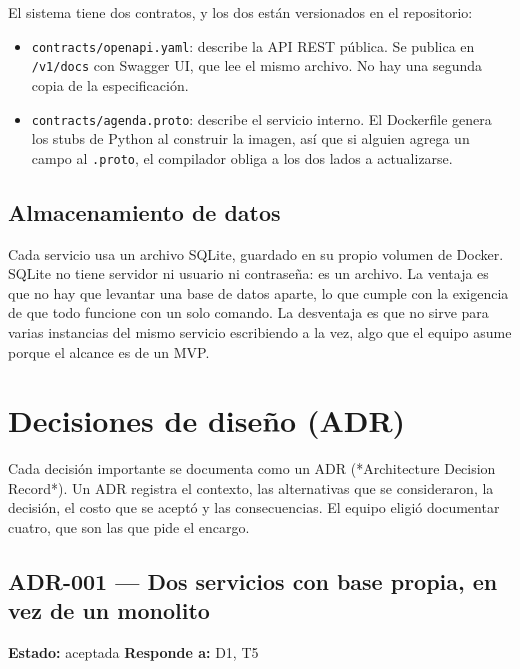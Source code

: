 \documentclass[12pt, a4paper]{article}
\begin{document}
El sistema tiene dos contratos, y los dos están versionados en el
repositorio:

\begin{itemize}[leftmargin=1.4cm]
    \item \texttt{contracts/openapi.yaml}: describe la API REST pública.
    Se publica en \texttt{/v1/docs} con Swagger UI, que lee el mismo
    archivo. No hay una segunda copia de la especificación.
    \item \texttt{contracts/agenda.proto}: describe el servicio interno.
    El Dockerfile genera los stubs de Python al construir la imagen, así
    que si alguien agrega un campo al \texttt{.proto}, el compilador
    obliga a los dos lados a actualizarse.
\end{itemize}

\subsection{Almacenamiento de datos}

Cada servicio usa un archivo SQLite, guardado en su propio volumen de
Docker. SQLite no tiene servidor ni usuario ni contraseña: es un archivo.
La ventaja es que no hay que levantar una base de datos aparte, lo que
cumple con la exigencia de que todo funcione con un solo comando. La
desventaja es que no sirve para varias instancias del mismo servicio
escribiendo a la vez, algo que el equipo asume porque el alcance es de un
MVP.


\newpage
\section{Decisiones de diseño (ADR)}\label{sec:adr}

Cada decisión importante se documenta como un ADR (*Architecture
Decision Record*). Un ADR registra el contexto, las alternativas que se
consideraron, la decisión, el costo que se aceptó y las consecuencias. El
equipo eligió documentar cuatro, que son las que pide el encargo.

\subsection{ADR-001 \texorpdfstring{---}{---} Dos servicios con base propia, en vez de un monolito}

\textbf{Estado:} aceptada \hfill \textbf{Responde a:} D1, T5
\end{document}
